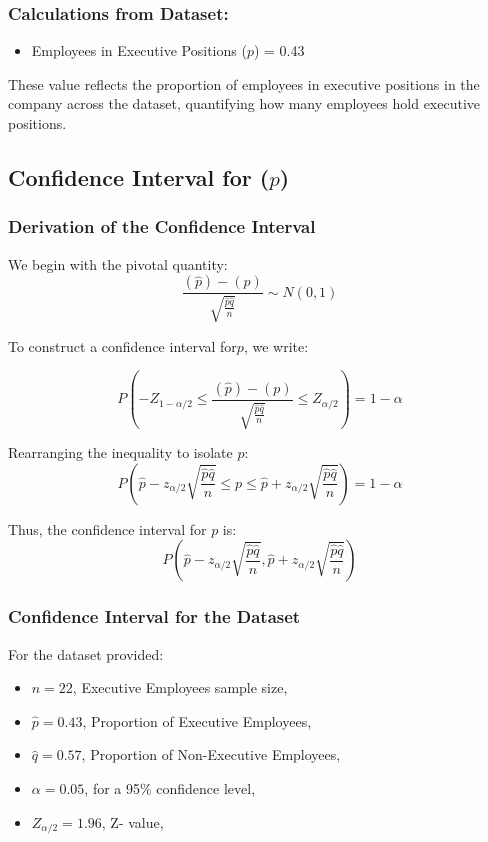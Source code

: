 \documentclass[12pt,a4paper]{article}
\begin{document}
\subsubsection*{Calculations from Dataset:}

\begin{itemize}
 \item Employees in Executive Positions ($p$) = 0.43 

\end{itemize}

These value reflects the proportion of employees in executive positions in the company across the dataset, quantifying how many employees hold executive positions. 
\newpage
\subsection*{Confidence Interval for  (\({p}\))}

\subsubsection*{Derivation of the Confidence Interval}

We begin with the pivotal quantity:
 \[
 \frac{(\hat{p})- (p)}{\sqrt{\frac{\hat{p}  \hat{q}}{n} }} \sim N(0,1)
\]

To construct a confidence interval for\({p}\), we write:

\[
P\left( -Z_{1-\alpha/2} \leq \frac{(\hat{p})- (p)}{\sqrt{\frac{\hat{p}  \hat{q}}{n} }} \leq Z_{\alpha/2} \right) = 1-\alpha
\]

Rearranging the inequality to isolate \({p}\):
\[
P\left( \hat{p} - z_{\alpha/2} \sqrt{\frac{\hat{p}\hat{q}}{n}} \leq {p} \leq \hat{p}+ z_{\alpha/2} \sqrt{\frac{\hat{p}\hat{q}}{n}} \right) = 1-\alpha
\]

Thus, the confidence interval for \({p}\) is:
\[
P\left( \hat{p} - z_{\alpha/2} \sqrt{\frac{\hat{p}\hat{q}}{n}}, \hat{p}+ z_{\alpha/2} \sqrt{\frac{\hat{p}\hat{q}}{n}} \right) 
\]

\subsubsection*{Confidence Interval for the Dataset}

For the dataset provided:
\begin{itemize}
    \item \(n = 22\), Executive Employees sample size,
    \item \( {\hat{p}}= 0.43\), Proportion of Executive Employees,
     \item \( {\hat{q}}= 0.57\), Proportion of Non-Executive Employees,
    \item \(\alpha = 0.05\), for a 95\% confidence level,
    \item \( Z_{\alpha/2} = 1.96\), Z- value,

\end{itemize}
\end{document}
